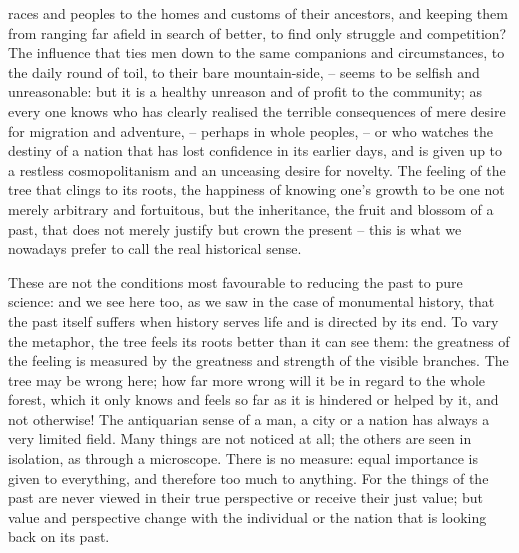 races and peoples to the homes and customs of their ancestors, and
keeping them from ranging far afield in search of better, to find
only struggle and competition? The influence that ties men down to
the same companions and circumstances, to the daily round of toil, to
their bare mountain-side, -- seems to be selfish and unreasonable: but
it is a healthy unreason and of profit to the community; as every one
knows who has clearly realised the terrible consequences of mere
desire for migration and adventure, -- perhaps in whole peoples, -- or
who watches the destiny of a nation that has lost confidence in its
earlier days, and is given up to a restless cosmopolitanism and an
unceasing desire for novelty. The feeling of the tree that clings to
its roots, the happiness of knowing one's growth to be one not merely
arbitrary and fortuitous, but the inheritance, the fruit and blossom
of a past, that does not merely justify but crown the present -- this
is what we nowadays prefer to call the real historical sense.

These are not the conditions most favourable to reducing the past to
pure science: and we see here too, as we saw in the case of
monumental history, that the past itself suffers when history serves
life and is directed by its end. To vary the metaphor, the tree feels
its roots better than it can see them: the greatness of the feeling
is measured by the greatness and strength of the visible branches.
The tree may be wrong here; how far more wrong will it be in regard
to the whole forest, which it only knows and feels so far as it is
hindered or helped by it, and not otherwise! The antiquarian sense of
a man, a city or a nation has always a very limited field. Many
things are not noticed at all; the others are seen in isolation, as
through a microscope. There is no measure: equal importance is given
to everything, and therefore too much to anything. For the things of
the past are never viewed in their true perspective or receive their
just value; but value and perspective change with the individual or
the nation that is looking back on its past.

